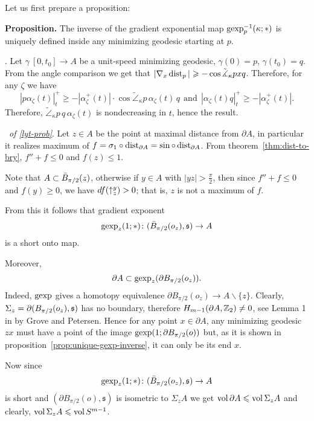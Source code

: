 \documentclass{article}
\begin{document}
Let us first prepare a proposition:

\begin{thm}{\bf Proposition.}\label{prop:unique-gexp-inverse}
The inverse of the gradient exponential map $\operatorname{gexp}^{-1}_p(\kappa;*)$ is uniquely
defined inside any minimizing geodesic starting at $p$.
\end{thm}

\Proof. Let $\gamma\:[0,t_0]\to A$ be a unit-speed minimizing geodesic,
$\gamma(0)=p$, $\gamma(t_0)=q$.
 From the angle comparison we get that $|\nabla_x\operatorname{dist}_p|\geqslant-\cos\tilde{\measuredangle}_\kappa p
x q$. Therefore, for any $\zeta$ we have
$$|p\alpha_\zeta(t)|^+_t
\ge 
-|\alpha^+_\zeta(t)|{\cdot}\cos\tilde\angle_\kappa
p\,\alpha_\zeta(t)\,q\ \ \text{and}\ \ |\alpha_\zeta(t)q|^+_t\ge-|\alpha^+_\zeta(t)|.$$
Therefore, $\tilde\angle_\kappa p\, q\, \alpha_\zeta(t)$ is nondecreasing in $t$, hence the result.
\qeds


\Proof\ \textit{of \ref{lyt-prob}}. 
Let $z\in A$ be the point at maximal distance from $\partial A$, in particular
it realizes maximum of $f=\sigma_1\circ\operatorname{dist}_{\partial
A}=\sin\circ\operatorname{dist}_{\partial A}$.
From theorem~\ref{thm:dist-to-bry}, $f''+f\le 0$ and $f(z)\le 1$.

Note that $A\subset \bar B_{\pi/2}(z)$, otherwise if $y\in A$ with $|y z|>\tfrac\pi2$, then
since $f''+f\le 0$ and $f(y)\ge 0$, 
we have $d f(\uparrow_z^y)>0$; 
that is, $z$ is not a maximum of $f$.

From this it follows that gradient exponent
$$\operatorname{gexp}_z(1;*)\colon(\bar B_{\pi/2}(o_z),\mathfrak s)\to A$$
is a short onto map. 

Moreover,
$$\partial A\subset\operatorname{gexp}_z(\partial B_{\pi/2}(o_z)).$$ 
Indeed, $\operatorname{gexp}$ gives a homotopy equivalence $\partial B_{\pi/2}(o_z)\to
A\backslash \{z\}$. 
Clearly, $\Sigma_z\z=\partial (B_{\pi/2}(o_z),\mathfrak s)$ has no boundary, therefore 
$H_{m-1}(\partial A,\mathbb{Z}_2)\not=0$, 
see Lemma 1 in \cite{grove-petersen:rad-sphere} by Grove and Petersen. 
Hence for any point $x\in\partial A$, any minimizing geodesic $z x$ must have
a point of the image $\operatorname{gexp}(1;\partial B_{\pi/2}(o))$ but, as it is shown in
proposition~\ref{prop:unique-gexp-inverse}, it can only be its end $x$. 

Now since $$\operatorname{gexp}_z(1;*)\colon(\bar B_{\pi/2}(o_z),\mathfrak s)\to A$$ is short and
$(\partial B_{\pi/2}(o),\mathfrak s)$ is isometric to $\Sigma_z A$ we get
$\operatorname{vol}\partial A\leqslant\operatorname{vol} \Sigma_z A$ and clearly, $\operatorname{vol} \Sigma_z A\leqslant \operatorname{vol} S^{m-1}$.\qeds
\end{document}
